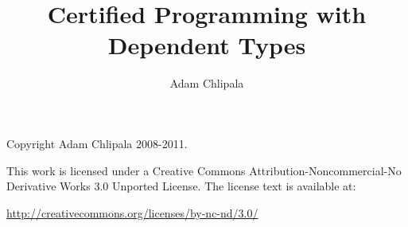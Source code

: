\documentclass[12pt]{report}
\title{Certified Programming with Dependent Types}
\author{Adam Chlipala}
\begin{document}
\maketitle

\thispagestyle{empty}
\mbox{}\vfill
\begin{center}

Copyright Adam Chlipala 2008-2011.


This work is licensed under a
Creative Commons Attribution-Noncommercial-No Derivative Works 3.0
Unported License.
The license text is available at:

\end{center}

\begin{center} \url{http://creativecommons.org/licenses/by-nc-nd/3.0/} \end{center}

\tableofcontents


















\clearpage
{}



\clearpage
{}
\printindex
\end{document}
